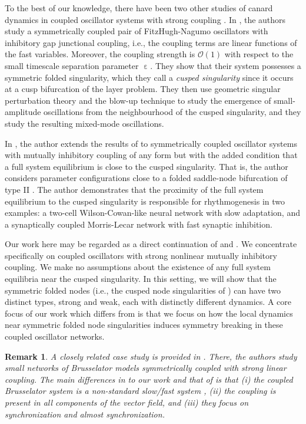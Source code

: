 \documentclass[10pt,onecolumn]{article}
\theoremstyle{plain}
\newtheorem{remark}{Remark}[section]
\DeclareMathOperator{\eps}{\varepsilon}
\begin{document}
To the best of our knowledge, there have been two other studies of canard dynamics in coupled oscillator systems with strong coupling \cite{Kristiansen2023,Pedersen2026}. 
In \cite{Kristiansen2023}, the authors study a symmetrically coupled pair of FitzHugh-Nagumo oscillators with inhibitory gap junctional coupling, i.e., the coupling terms are linear functions of the fast variables. Moreover, the coupling strength is $\mathcal O(1)$ with respect to the small timescale separation parameter $\eps$. They show that their system possesses a symmetric folded singularity, which they call a {\em cusped singularity} since it occurs at a cusp bifurcation of the layer problem. They then use geometric singular perturbation theory and the blow-up technique to study the emergence of small-amplitude oscillations from the neighbourhood of the cusped singularity, and they study the resulting mixed-mode oscillations. 

In \cite{Pedersen2026}, the author extends the results of \cite{Kristiansen2023} to symmetrically coupled oscillator systems with mutually inhibitory coupling of any form but with the added condition that a full system equilibrium is close to the cusped singularity. 
That is, the author considers parameter configurations close to a folded saddle-node bifurcation of type II \cite{Krupa2010}.
The author demonstrates that the proximity of the full system equilibrium to the cusped singularity is responsible for rhythmogenesis in two examples: a two-cell Wilson-Cowan-like neural network with slow adaptation, and a synaptically coupled Morris-Lecar network with fast synaptic inhibition. 

Our work here may be regarded as a direct continuation of \cite{Kristiansen2023} and \cite{Pedersen2026}. 
We concentrate specifically on coupled oscillators with strong nonlinear mutually inhibitory coupling. 
We make no assumptions about the existence of any full system equilibria near the cusped singularity. 
In this setting, we will show that the symmetric folded nodes (i.e., the cusped node singularities of \cite{Kristiansen2023}) can have two distinct types, strong and weak, each with distinctly different dynamics. 
A core focus of our work which differs from \cite{Kristiansen2023,Pedersen2026} is that we focus on how the local dynamics near symmetric folded node singularities induces symmetry breaking in these coupled oscillator networks. 

\medskip
\begin{remark}
A closely related case study is provided in \cite{MayoraCebollero2025}. There, the authors study small networks of Brusselator models symmetrically coupled with strong linear coupling. The main differences in \cite{MayoraCebollero2025} to our work and that of \cite{Kristiansen2023,Pedersen2026} is that (i) the coupled Brusselator system is a non-standard slow/fast system \cite{Wexbook}, (ii) the coupling is present in all components of the vector field, and (iii) they focus on synchronization and almost synchronization. 
\end{remark}
\end{document}
